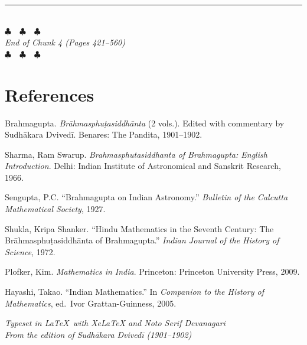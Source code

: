 \documentclass[11pt,a4paper]{article}
\newcommand{\longline}{\noindent\rule{\textwidth}{0.4pt}}
\begin{document}
\vspace{1cm}
\begin{center}
\longline\\[0.5cm]
{\Large\color{endmarkcolor}$\clubsuit$~~$\clubsuit$~~$\clubsuit$}\\[0.3cm]
\textit{End of Chunk 4 (Pages 421--560)}\\[0.3cm]
{\large\color{endmarkcolor}$\clubsuit$~~$\clubsuit$~~$\clubsuit$}
\end{center}

\newpage

\section*{References}

\begin{enumerate}[label={[\arabic*]}]
  \item Brahmagupta. \textit{Brāhmasphuṭasiddhānta} (2 vols.). Edited with 
  commentary by Sudhākara Dvivedī. Benares: The Pandita, 1901--1902.
  
  \item Sharma, Ram Swarup. \textit{Brahmasphutasiddhanta of Brahmagupta: 
  English Introduction}. Delhi: Indian Institute of Astronomical and Sanskrit 
  Research, 1966.
  
  \item Sengupta, P.C. ``Brahmagupta on Indian Astronomy.'' \textit{Bulletin 
  of the Calcutta Mathematical Society}, 1927.
  
  \item Shukla, Kripa Shanker. ``Hindu Mathematics in the Seventh Century: 
  The Brāhmasphuṭasiddhānta of Brahmagupta.'' \textit{Indian Journal of the 
  History of Science}, 1972.
  
  \item Plofker, Kim. \textit{Mathematics in India}. Princeton: Princeton 
  University Press, 2009.
  
  \item Hayashi, Takao. ``Indian Mathematics.'' In \textit{Companion to the 
  History of Mathematics}, ed.\ Ivor Grattan-Guinness, 2005.
\end{enumerate}

\vfill
\begin{center}
\textit{Typeset in \LaTeX\ with XeLaTeX and Noto Serif Devanagari}\\
\textit{From the edition of Sudhākara Dvivedī (1901--1902)}
\end{center}
\end{document}
